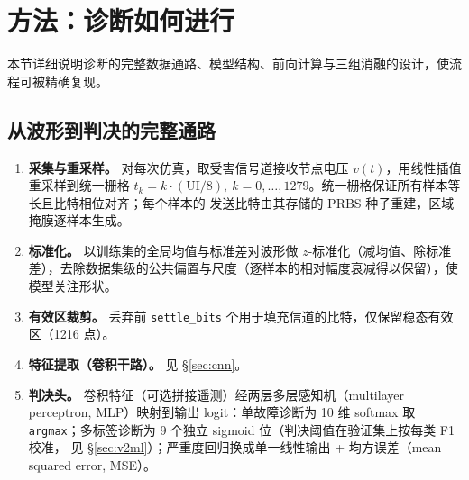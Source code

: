 \documentclass[11pt,a4paper,fontset=mac]{ctexart}
\begin{document}
\section{方法：诊断如何进行}\label{sec:method}

本节详细说明诊断的完整数据通路、模型结构、前向计算与三组消融的设计，使流程可被精确复现。

\subsection{从波形到判决的完整通路}
\begin{enumerate}[label=\textbf{步骤\arabic*.}]
\item \textbf{采集与重采样。} 对每次仿真，取受害信号道接收节点电压 $v(t)$，用线性插值重采样到统一栅格
$t_k = k\cdot(\text{UI}/8),\ k=0,\dots,1279$。统一栅格保证所有样本等长且比特相位对齐；每个样本的
发送比特由其存储的 PRBS 种子重建，区域掩膜逐样本生成。
\item \textbf{标准化。} 以训练集的全局均值与标准差对波形做 $z$-标准化（减均值、除标准差），去除数据集级的公共偏置与尺度（逐样本的相对幅度衰减得以保留），使模型关注形状。
\item \textbf{有效区裁剪。} 丢弃前 \texttt{settle\_bits} 个用于填充信道的比特，仅保留稳态有效区（1216 点）。
\item \textbf{特征提取（卷积干路）。} 见 \S\ref{sec:cnn}。
\item \textbf{判决头。} 卷积特征（可选拼接遥测）经两层多层感知机（multilayer perceptron, MLP）映射到输出 logit：单故障诊断为
10 维 softmax 取 \texttt{argmax}；多标签诊断为 9 个独立 sigmoid 位（判决阈值在验证集上按每类 F1 校准，
见 \S\ref{sec:v2ml}）；严重度回归换成单一线性输出 + 均方误差（mean squared error, MSE）。
\end{enumerate}
\end{document}
